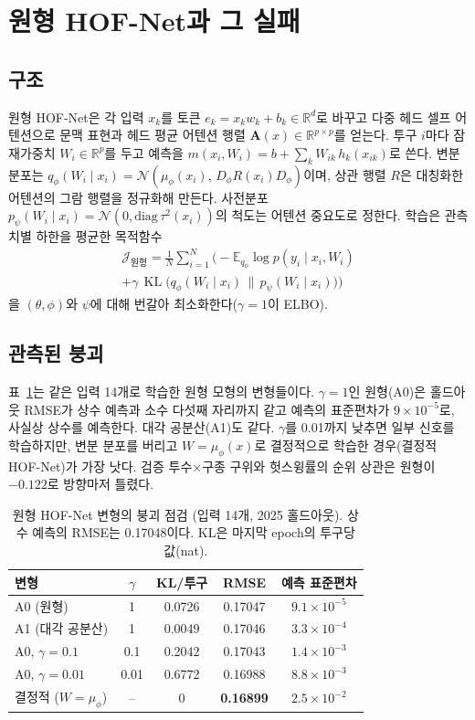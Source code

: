 \documentclass[journal,a4paper,10pt]{IEEEtran}
\newcommand{\KL}{\operatorname{KL}}
\newcommand{\E}{\mathbb{E}}
\newcommand{\N}{\mathcal{N}}
\begin{document}
\section{원형 HOF-Net과 그 실패}
\label{sec:hofnet}

\subsection{구조}
원형 HOF-Net은 각 입력 $x_k$를 토큰 $e_k = x_k w_k + b_k\in\mathbb{R}^d$로 바꾸고 다중 헤드 셀프 어텐션으로 문맥 표현과 헤드 평균 어텐션 행렬 $\mathbf{A}(x)\in\mathbb{R}^{p\times p}$를 얻는다. 투구 $i$마다 잠재가중치 $W_i\in\mathbb{R}^p$를 두고 예측을 $m(x_i,W_i)=b+\sum_k W_{ik}\,h_k(x_{ik})$로 쓴다. 변분 분포는 $q_\phi(W_i\mid x_i)=\N(\mu_\phi(x_i),\,D_\phi R(x_i) D_\phi)$이며, 상관 행렬 $R$은 대칭화한 어텐션의 그람 행렬을 정규화해 만든다. 사전분포 $p_\psi(W_i\mid x_i)=\N(0,\mathrm{diag}\,\tau^2(x_i))$의 척도는 어텐션 중요도로 정한다. 학습은 관측치별 하한을 평균한 목적함수
\begin{multline}
\mathcal{J}_{\text{원형}}=\frac{1}{N}\sum_{i=1}^{N}\Big(-\E_{q_\phi}\log p(y_i\mid x_i,W_i)\\
+\gamma\,\KL\big(q_\phi(W_i\mid x_i)\,\|\,p_\psi(W_i\mid x_i)\big)\Big)
\label{eq:orig}
\end{multline}
을 $(\theta,\phi)$와 $\psi$에 대해 번갈아 최소화한다($\gamma=1$이 ELBO).

\subsection{관측된 붕괴}
표~\ref{tab:collapse}는 같은 입력 14개로 학습한 원형 모형의 변형들이다. $\gamma=1$인 원형(A0)은 홀드아웃 RMSE가 상수 예측과 소수 다섯째 자리까지 같고 예측의 표준편차가 $9\times10^{-5}$로, 사실상 상수를 예측한다. 대각 공분산(A1)도 같다. $\gamma$를 0.01까지 낮추면 일부 신호를 학습하지만, 변분 분포를 버리고 $W=\mu_\phi(x)$로 결정적으로 학습한 경우(결정적 HOF-Net)가 가장 낫다. 검증 투수×구종 구위와 헛스윙률의 순위 상관은 원형이 $-0.122$로 방향마저 틀렸다.

\begin{table}[!t]
\centering
\caption{원형 HOF-Net 변형의 붕괴 점검 (입력 14개, 2025 홀드아웃). 상수 예측의 RMSE는 0.17048이다. KL은 마지막 epoch의 투구당 값(nat).}
\label{tab:collapse}
\footnotesize
\begin{tabular}{@{}lcccc@{}}
\toprule
변형 & $\gamma$ & KL/투구 & RMSE & 예측 표준편차 \\
\midrule
A0 (원형) & 1 & 0.0726 & 0.17047 & $9.1\times10^{-5}$ \\
A1 (대각 공분산) & 1 & 0.0049 & 0.17046 & $3.3\times10^{-4}$ \\
A0, $\gamma{=}0.1$ & 0.1 & 0.2042 & 0.17043 & $1.4\times10^{-3}$ \\
A0, $\gamma{=}0.01$ & 0.01 & 0.6772 & 0.16988 & $8.8\times10^{-3}$ \\
결정적 ($W{=}\mu_\phi$) & – & 0 & \textbf{0.16899} & $2.5\times10^{-2}$ \\
\bottomrule
\end{tabular}
\end{table}
\end{document}

